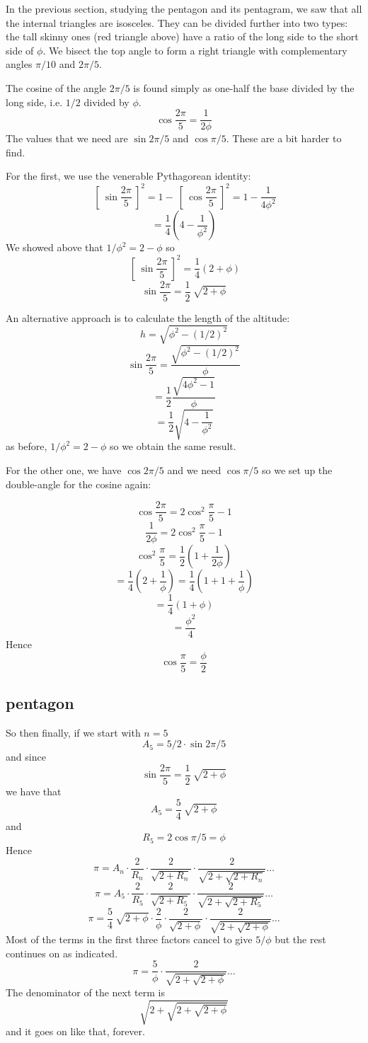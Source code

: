\documentclass[11pt, oneside]{article}
\begin{document}
In the previous section, studying the pentagon and its pentagram, we saw that all the internal triangles are isosceles.  They can be divided further into two types:  the tall skinny ones (red triangle above) have a ratio of the long side to the short side of $\phi$.  We bisect the top angle to form a right triangle with complementary angles $\pi/10$ and $2 \pi/5$.

The cosine of the angle $2 \pi / 5$ is found simply as one-half the base divided by the long side, i.e. $1/2$ divided by $\phi$.
\[ \cos \frac{2 \pi}{5} = \frac{1}{2 \phi} \]
The values that we need are $\sin 2\pi/5$ and $\cos \pi/5$.  These are a bit harder to find.

For the first, we use the venerable Pythagorean identity:
\[ \ [ \ \sin \frac{2 \pi}{5} \ ]^2 = 1 - \ [ \ \cos \frac{2 \pi}{5} \ ]^2  = 1 - \frac{1}{4 \phi^2} \]
\[ = \frac{1}{4}(4 - \frac{1}{\phi^2}) \]
We showed above that $1/\phi^2 = 2 - \phi$ so
\[ \ [ \ \sin \frac{2 \pi}{5} \ ]^2 = \frac{1}{4}(2 + \phi) \]
\[ \sin \frac{2 \pi}{5} = \frac{1}{2} \ \sqrt{2 + \phi} \]

An alternative approach is to calculate the length of the altitude:
\[ h = \sqrt{\phi^2 - (1/2)^2} \]
\[ \sin \frac{2 \pi}{5} = \frac{\sqrt{\phi^2 - (1/2)^2}}{\phi} \]
\[ = \frac{1}{2} {\frac{\sqrt{4 \phi^2 - 1}}{\phi}} \]
\[ = \frac{1}{2} \sqrt{4 - \frac{1}{\phi^2}} \]
as before, $1/\phi^2 = 2 - \phi$ so we obtain the same result.

For the other one, we have $\cos 2\pi/5$ and we need $\cos \pi/5$ so we set up the double-angle for the cosine again:

\[ \cos \frac{2 \pi}{5} = 2 \cos^2 \frac{\pi}{5} - 1 \]
\[ \frac{1}{2 \phi} = 2 \cos^2 \frac{\pi}{5}  - 1 \]
\[ \cos^2 \frac{\pi}{5} = \frac{1}{2} ( 1 +  \frac{1}{2 \phi}) \]
\[ = \frac{1}{4} ( 2 +  \frac{1}{\phi}) = \frac{1}{4} ( 1 + 1 +  \frac{1}{\phi})  \]
\[ = \frac{1}{4} ( 1 +  \phi) \]
\[ = \frac{\phi^2}{4} \]
Hence
\[ \cos \frac{\pi}{5} = \frac{\phi}{2}  \]

\subsection*{pentagon}
So then finally, if we start with $n=5$
\[ A_5 = 5/2 \cdot \sin 2 \pi/5 \]
and since
\[ \sin \frac{2 \pi}{5} = \frac{1}{2} \ \sqrt{2 + \phi} \]
we have that
\[ A_5 = \frac{5}{4} \ \sqrt{2 + \phi}   \]
and
\[ R_5 = 2 \cos \pi / 5 = \phi \]
Hence
\[ \pi = A_n \cdot \frac{2}{R_n} \cdot \frac{2}{\sqrt{2 + R_n}} \cdot \frac{2}{\sqrt{2 + \sqrt{2 + R_n}}}  \dots \]
\[ \pi = A_5 \cdot \frac{2}{R_5} \cdot \frac{2}{\sqrt{2 + R_5}} \cdot \frac{2}{\sqrt{2 + \sqrt{2 + R_5}}}  \dots \]
\[ \pi =  \frac{5}{4} \ \sqrt{2 + \phi} \cdot \frac{2}{\phi} \cdot \frac{2}{\sqrt{2 + \phi}} \cdot \frac{2}{\sqrt{2 + \sqrt{2 + \phi}}} \dots \]
Most of the terms in the first three factors cancel to give $5/\phi$ but the rest continues on as indicated.  
\[ \pi =  \frac{5}{\phi} \cdot \frac{2}{\sqrt{2 + \sqrt{2 + \phi}}} \dots \]
The denominator of the next term is
\[ \sqrt{2 + \sqrt{2 + \sqrt{2 + \phi}}} \]
and it goes on like that, forever.
\end{document}
